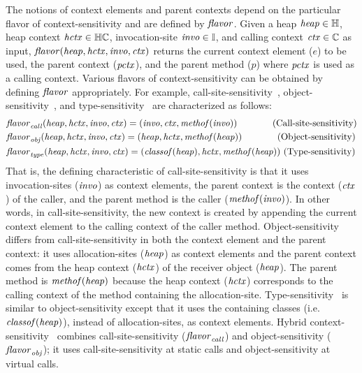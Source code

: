 The notions of context elements and parent contexts depend on the
particular flavor of context-sensitivity and are defined
by ${\it flavor}$. Given a heap ${\it heap} \in \mathbb{H}$, heap context
${\it hctx} \in \mathbb{H}\mathbb{C}$, invocation-site ${\it invo} \in \mathbb{I}$, and calling
context ${\it ctx} \in \mathbb{C}$ as input,
${\it flavor}({\it heap},{\it hctx},{\it invo},{\it ctx})$ returns the current context element ($e$) to be used, the parent context (${\it pctx}$), and
the parent method ($p$) where ${\it pctx}$ is used as a calling context. Various flavors of
context-sensitivity can be obtained by defining ${\it flavor}$
appropriately. For example, call-site-sensitivity~\cite{Shivers1988},
object-sensitivity~\cite{Milanova2005}, and
type-sensitivity~\cite{Smaragdakis2011} are characterized as follows:
\begin{align*}
 & {\it flavor}_{\it call} ({\it heap}, {\it hctx}, {\it invo}, {\it ctx}) = ( {\it invo}, {\it ctx},
  {\it methof}({\it invo})) \qquad\quad\,\,\,\,\, \mbox{(Call-site-sensitivity)} \\
 & {\it flavor}_{\it obj} ({\it heap}, {\it hctx}, {\it invo}, {\it ctx}) = ({\it heap}, {\it hctx},
                                               {\it methof}({\it heap})) \qquad\quad\,\,\,\,\, \mbox{(Object-sensitivity)} \\
 & {\it flavor}_{\it type} ({\it heap}, {\it hctx}, {\it invo}, {\it ctx}) = ({\it classof}({\it heap}),
                                               {\it hctx}, {\it methof}({\it heap}))
                                               \,\, \mbox{(Type-sensitivity)}
\end{align*}
That is, the defining characteristic of call-site-sensitivity is that
it uses invocation-sites (${\it invo}$) as
context elements, the parent context is the context (${\it ctx}$) of the
caller, and the parent method is the caller (${\it methof}({\it
  invo})$). In other words, in call-site-sensitivity, the new context
is created by appending the current context element to the calling
context of the caller method.  Object-sensitivity~\cite{Milanova2005}
differs from call-site-sensitivity in both the context element and the
parent context: it uses allocation-sites (${\it heap}$) as
context elements and the parent context comes from the heap context
(${\it hctx}$) of the receiver object (${\it heap}$). The parent method is
${\it methof}({\it heap})$ because the heap context (${\it hctx}$)
corresponds to the calling context of the method
containing the
allocation-site. Type-sensitivity~\cite{Smaragdakis2011} is similar to
object-sensitivity except that it uses the containing classes (i.e. ${\it classof}({\it heap})$), instead
of allocation-sites, as context elements.
Hybrid context-sensitivity~\cite{KastrinisS13a} combines
call-site-sensitivity (${\it flavor}_{\it call}$) and object-sensitivity
(${\it flavor}_{\it obj}$); it uses call-site-sensitivity at static calls and
object-sensitivity at virtual calls.






